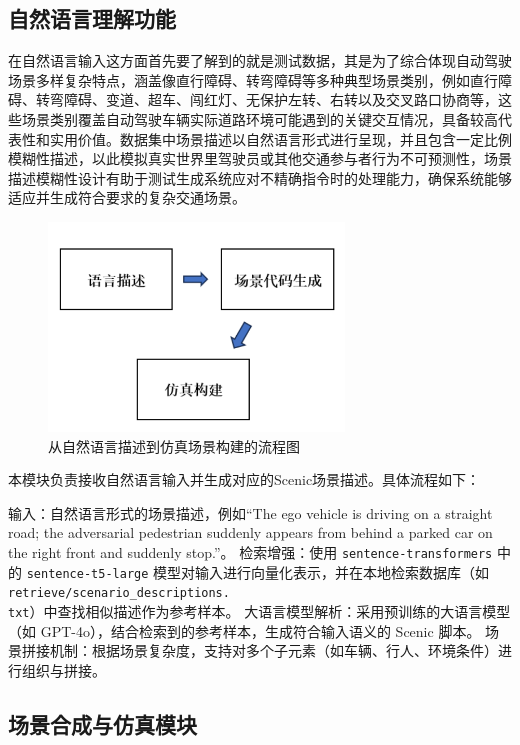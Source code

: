 \subsection{自然语言理解功能}
在自然语言输入这方面首先要了解到的就是测试数据，其是为了综合体现自动驾驶场景多样复杂特点，涵盖像直行障碍、转弯障碍等多种典型场景类别，例如直行障碍、转弯障碍、变道、超车、闯红灯、无保护左转、右转以及交叉路口协商等，这些场景类别覆盖自动驾驶车辆实际道路环境可能遇到的关键交互情况，具备较高代表性和实用价值。数据集中场景描述以自然语言形式进行呈现，并且包含一定比例模糊性描述，以此模拟真实世界里驾驶员或其他交通参与者行为不可预测性，场景描述模糊性设计有助于测试生成系统应对不精确指令时的处理能力，确保系统能够适应并生成符合要求的复杂交通场景。
\begin{figure}[H]
	\centering
	\includegraphics[width=0.7\textwidth]{"images/流程图1.pdf"}
	\caption{从自然语言描述到仿真场景构建的流程图}
	\label{fig:flowchart}
\end{figure}

本模块负责接收自然语言输入并生成对应的Scenic场景描述。具体流程如下：

输入：自然语言形式的场景描述，例如“The ego vehicle is driving on a straight road; the adversarial pedestrian suddenly appears from behind a parked car on the right front and suddenly stop.”。
检索增强：使用 \texttt{sentence-transformers} 中的 \texttt{sentence-t5-large} 模型对输入进行向量化表示，并在本地检索数据库（如 \texttt{retrieve/scenario\_descriptions.\\txt}）中查找相似描述作为参考样本。
大语言模型解析：采用预训练的大语言模型（如 GPT-4o），结合检索到的参考样本，生成符合输入语义的 Scenic 脚本。
场景拼接机制：根据场景复杂度，支持对多个子元素（如车辆、行人、环境条件）进行组织与拼接。



\subsection{场景合成与仿真模块}

